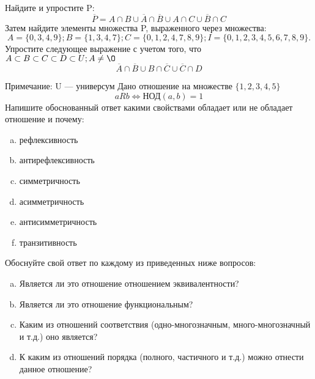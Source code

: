 \documentclass[10pt]{exam}
\begin{document}
\begin{questions}
\question
Найдите и упростите P:
\begin{equation*}
\overline{P} = A \cap B \cup \overline{A} \cap \overline{B} \cup A \cap C \cup \overline{B} \cap C
\end{equation*}
Затем найдите элементы множества P, выраженного через множества:
\begin{equation*}
A = \{0, 3, 4, 9\}; 
B = \{1, 3, 4, 7\};
C = \{0, 1, 2, 4, 7, 8, 9\};
I = \{0, 1, 2, 3, 4, 5, 6, 7, 8, 9\}.
\end{equation*}\question
Упростите следующее выражение с учетом того, что $A\subset B \subset C \subset D \subset U; A \neq \O$
\begin{equation*}
\overline{A} \cap \overline{B} \cup B \cap \overline{C} \cup \overline{C} \cap D
\end{equation*}

Примечание: U — универсум\question
Дано отношение на множестве $\{1, 2, 3, 4, 5\}$ 
\begin{equation*}
aRb \iff  \text{НОД}(a,b) =1
\end{equation*}
Напишите обоснованный ответ какими свойствами обладает или не обладает отношение и почему:   
\begin{enumerate} [a)]\setcounter{enumi}{0}
\item рефлексивность
\item антирефлексивность
\item симметричность
\item асимметричность
\item антисимметричность
\item транзитивность
\end{enumerate}

Обоснуйте свой ответ по каждому из приведенных ниже вопросов:
\begin{enumerate} [a)]\setcounter{enumi}{0}
    \item Является ли это отношение отношением эквивалентности?
    \item Является ли это отношение функциональным?
    \item Каким из отношений соответствия (одно-многозначным, много-многозначный и т.д.) оно является?
    \item К каким из отношений порядка (полного, частичного и т.д.) можно отнести данное отношение?
\end{enumerate}



\end{questions}
\end{document}
